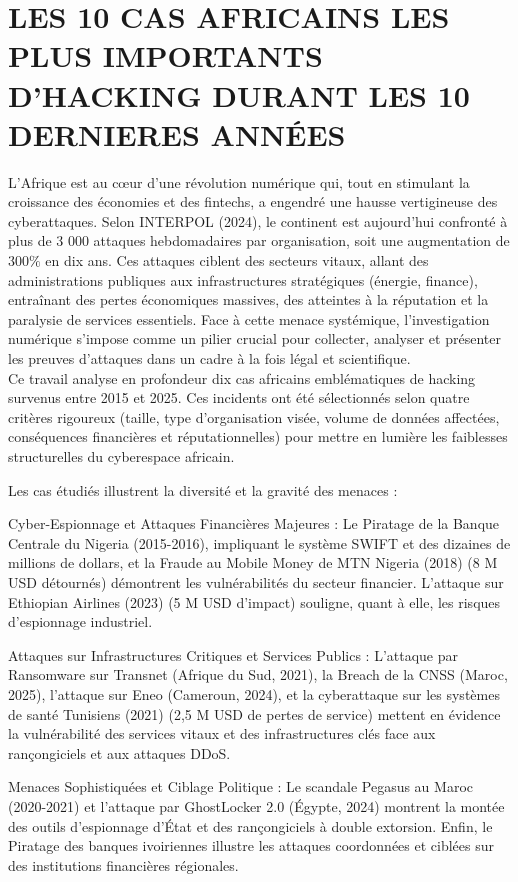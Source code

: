 \documentclass[12pt, openany]{report}
\begin{document}
\section{LES 10 CAS AFRICAINS LES PLUS IMPORTANTS D'HACKING DURANT LES 10 DERNIERES ANNÉES }

L'Afrique est au cœur d'une révolution numérique qui, tout en stimulant la croissance des économies et des fintechs, a engendré une hausse vertigineuse des cyberattaques. Selon INTERPOL (2024), le continent est aujourd'hui confronté à plus de 3 000 attaques hebdomadaires par organisation, soit une augmentation de $300\%$ en dix ans. Ces attaques ciblent des secteurs vitaux, allant des administrations publiques aux infrastructures stratégiques (énergie, finance), entraînant des pertes économiques massives, des atteintes à la réputation et la paralysie de services essentiels. Face à cette menace systémique, l'investigation numérique s'impose comme un pilier crucial pour collecter, analyser et présenter les preuves d'attaques dans un cadre à la fois légal et scientifique.\\

Ce travail analyse en profondeur dix cas africains emblématiques de hacking survenus entre 2015 et 2025. Ces incidents ont été sélectionnés selon quatre critères rigoureux (taille, type d'organisation visée, volume de données affectées, conséquences financières et réputationnelles) pour mettre en lumière les faiblesses structurelles du cyberespace africain.

Les cas étudiés illustrent la diversité et la gravité des menaces :

Cyber-Espionnage et Attaques Financières Majeures : Le Piratage de la Banque Centrale du Nigeria (2015-2016), impliquant le système SWIFT et des dizaines de millions de dollars, et la Fraude au Mobile Money de MTN Nigeria (2018) (8 M USD détournés) démontrent les vulnérabilités du secteur financier. L'attaque sur Ethiopian Airlines (2023) (5 M USD d'impact) souligne, quant à elle, les risques d'espionnage industriel.

Attaques sur Infrastructures Critiques et Services Publics : L'attaque par Ransomware sur Transnet (Afrique du Sud, 2021), la Breach de la CNSS (Maroc, 2025), l'attaque sur Eneo (Cameroun, 2024), et la cyberattaque sur les systèmes de santé Tunisiens (2021) (2,5 M USD de pertes de service) mettent en évidence la vulnérabilité des services vitaux et des infrastructures clés face aux rançongiciels et aux attaques DDoS.

Menaces Sophistiquées et Ciblage Politique : Le scandale Pegasus au Maroc (2020-2021) et l'attaque par GhostLocker 2.0 (Égypte, 2024) montrent la montée des outils d'espionnage d'État et des rançongiciels à double extorsion. Enfin, le Piratage des banques ivoiriennes illustre les attaques coordonnées et ciblées sur des institutions financières régionales.
\end{document}

